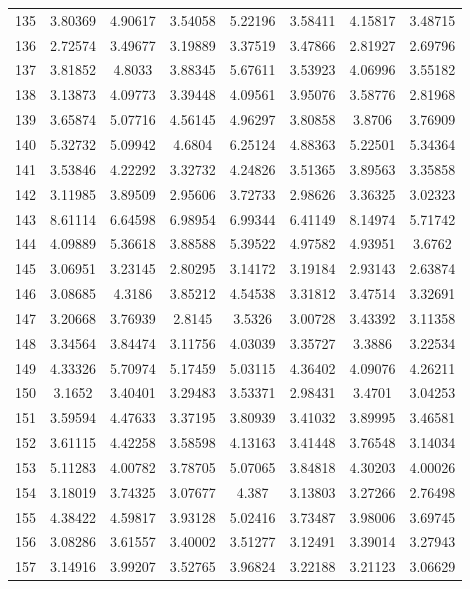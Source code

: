 \begin{center}
\begin{longtable}{cccccccc}
135 & 3.80369 & 4.90617 & 3.54058 & 5.22196 & 3.58411 & 4.15817 & 3.48715\\
136 & 2.72574 & 3.49677 & 3.19889 & 3.37519 & 3.47866 & 2.81927 & 2.69796\\
137 & 3.81852 & 4.8033 & 3.88345 & 5.67611 & 3.53923 & 4.06996 & 3.55182\\
138 & 3.13873 & 4.09773 & 3.39448 & 4.09561 & 3.95076 & 3.58776 & 2.81968\\
139 & 3.65874 & 5.07716 & 4.56145 & 4.96297 & 3.80858 & 3.8706 & 3.76909\\
140 & 5.32732 & 5.09942 & 4.6804 & 6.25124 & 4.88363 & 5.22501 & 5.34364\\
141 & 3.53846 & 4.22292 & 3.32732 & 4.24826 & 3.51365 & 3.89563 & 3.35858\\
142 & 3.11985 & 3.89509 & 2.95606 & 3.72733 & 2.98626 & 3.36325 & 3.02323\\
143 & 8.61114 & 6.64598 & 6.98954 & 6.99344 & 6.41149 & 8.14974 & 5.71742\\
144 & 4.09889 & 5.36618 & 3.88588 & 5.39522 & 4.97582 & 4.93951 & 3.6762\\
145 & 3.06951 & 3.23145 & 2.80295 & 3.14172 & 3.19184 & 2.93143 & 2.63874\\
146 & 3.08685 & 4.3186 & 3.85212 & 4.54538 & 3.31812 & 3.47514 & 3.32691\\
147 & 3.20668 & 3.76939 & 2.8145 & 3.5326 & 3.00728 & 3.43392 & 3.11358\\
148 & 3.34564 & 3.84474 & 3.11756 & 4.03039 & 3.35727 & 3.3886 & 3.22534\\
149 & 4.33326 & 5.70974 & 5.17459 & 5.03115 & 4.36402 & 4.09076 & 4.26211\\
150 & 3.1652 & 3.40401 & 3.29483 & 3.53371 & 2.98431 & 3.4701 & 3.04253\\
151 & 3.59594 & 4.47633 & 3.37195 & 3.80939 & 3.41032 & 3.89995 & 3.46581\\
152 & 3.61115 & 4.42258 & 3.58598 & 4.13163 & 3.41448 & 3.76548 & 3.14034\\
153 & 5.11283 & 4.00782 & 3.78705 & 5.07065 & 3.84818 & 4.30203 & 4.00026\\
154 & 3.18019 & 3.74325 & 3.07677 & 4.387 & 3.13803 & 3.27266 & 2.76498\\
155 & 4.38422 & 4.59817 & 3.93128 & 5.02416 & 3.73487 & 3.98006 & 3.69745\\
156 & 3.08286 & 3.61557 & 3.40002 & 3.51277 & 3.12491 & 3.39014 & 3.27943\\
157 & 3.14916 & 3.99207 & 3.52765 & 3.96824 & 3.22188 & 3.21123 & 3.06629\\

\end{longtable}
\end{center}
